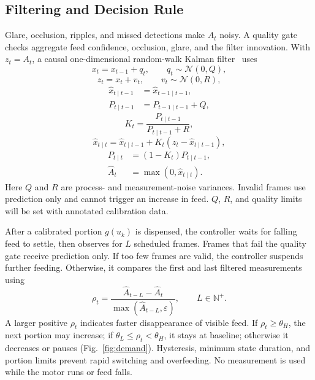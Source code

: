 \documentclass[10pt,conference,letterpaper]{IEEEtran}
\begin{document}
\subsection{Filtering and Decision Rule}
Glare, occlusion, ripples, and missed detections make $A_t$ noisy. A quality gate checks aggregate feed confidence, occlusion, glare, and the filter innovation. With $z_t=A_t$, a causal one-dimensional random-walk Kalman filter~\cite{kalman1960} uses
\begin{equation}
x_t=x_{t-1}+q_t,\qquad q_t\sim\mathcal{N}(0,Q),
\label{eq:process}
\end{equation}
\begin{equation}
z_t=x_t+v_t,\qquad v_t\sim\mathcal{N}(0,R),
\label{eq:measurement}
\end{equation}
\begin{equation}
\begin{aligned}
\hat x_{t\mid t-1}&=\hat x_{t-1\mid t-1},\\
P_{t\mid t-1}&=P_{t-1\mid t-1}+Q,
\end{aligned}
\label{eq:prediction}
\end{equation}
\begin{equation}
K_t=\frac{P_{t\mid t-1}}{P_{t\mid t-1}+R},
\label{eq:gain}
\end{equation}
\begin{equation}
\hat x_{t\mid t}=\hat x_{t\mid t-1}+K_t(z_t-\hat x_{t\mid t-1}),
\label{eq:update}
\end{equation}
\begin{equation}
\begin{aligned}
P_{t\mid t}&=(1-K_t)P_{t\mid t-1},\\
\hat A_t&=\max(0,\hat x_{t\mid t}).
\end{aligned}
\label{eq:posterior}
\end{equation}
Here $Q$ and $R$ are process- and measurement-noise variances. Invalid frames use prediction only and cannot trigger an increase in feed. $Q$, $R$, and quality limits will be set with annotated calibration data.

After a calibrated portion $g(u_k)$ is dispensed, the controller waits for falling feed to settle, then observes for $L$ scheduled frames. Frames that fail the quality gate receive prediction only. If too few frames are valid, the controller suspends further feeding. Otherwise, it compares the first and last filtered measurements using
\begin{equation}
\rho_t=\frac{\hat A_{t-L}-\hat A_t}{\max(\hat A_{t-L},\varepsilon)},\qquad L\in\mathbb{N}^{+}.
\label{eq:rho}
\end{equation}
A larger positive $\rho_t$ indicates faster disappearance of visible feed. If $\rho_t\geq\theta_H$, the next portion may increase; if $\theta_L\leq\rho_t<\theta_H$, it stays at baseline; otherwise it decreases or pauses (Fig.~\ref{fig:demand}). Hysteresis, minimum state duration, and portion limits prevent rapid switching and overfeeding. No measurement is used while the motor runs or feed falls.
\end{document}
